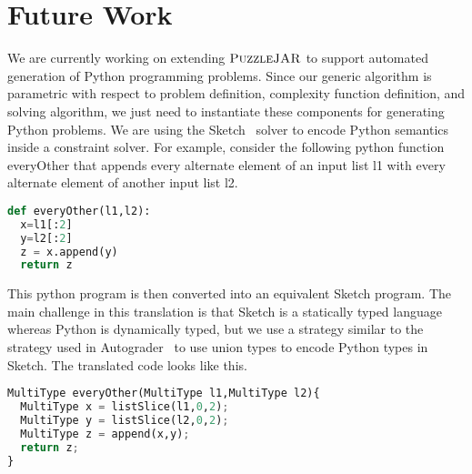\section{Future Work}

We are currently working on extending $\textsc{PuzzleJAR}$ to support
automated generation of Python programming problems. Since our generic
algorithm is parametric with respect to problem definition, complexity
function definition, and solving algorithm, we just need to
instantiate these components for generating Python problems. We are
using the Sketch~\cite{sketchjournal,sketch06} solver to encode Python
semantics inside a constraint solver. For example, consider the
following python function everyOther that appends every alternate
element of an input list l1 with every alternate element of another
input list l2.

\singlespace
\begin{lstlisting}[language=Python, frame=single]
def everyOther(l1,l2):
  x=l1[:2]
  y=l2[:2]
  z = x.append(y)
  return z

\end{lstlisting}




\doublespace

This python program is then converted into an equivalent Sketch program. The main challenge in this translation is that Sketch is a statically typed language whereas Python is dynamically typed, but we use a strategy similar to the strategy used in Autograder~\cite{autograder} to use union types to encode Python types in Sketch. The translated code looks like this.

\singlespace
\begin{lstlisting}[language=Python, frame=single]
MultiType everyOther(MultiType l1,MultiType l2){
  MultiType x = listSlice(l1,0,2);
  MultiType y = listSlice(l2,0,2);
  MultiType z = append(x,y);
  return z;
}
\end{lstlisting}
\doublespace

